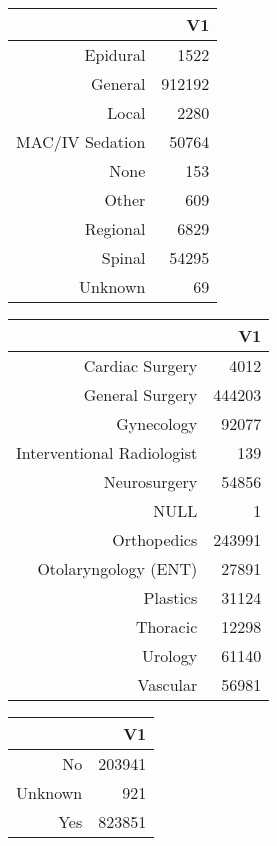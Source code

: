 \bigskip\bigskip
\centering
\begin{tabular}{rr}
  \hline
 & V1 \\ 
  \hline
Epidural & 1522 \\ 
  General & 912192 \\ 
  Local & 2280 \\ 
  MAC/IV Sedation & 50764 \\ 
  None & 153 \\ 
  Other & 609 \\ 
  Regional & 6829 \\ 
  Spinal & 54295 \\ 
  Unknown &  69 \\ 
   \hline
\end{tabular}

\bigskip\bigskip
\centering
\begin{tabular}{rr}
  \hline
 & V1 \\ 
  \hline
Cardiac Surgery & 4012 \\ 
  General Surgery & 444203 \\ 
  Gynecology & 92077 \\ 
  Interventional Radiologist & 139 \\ 
  Neurosurgery & 54856 \\ 
  NULL &   1 \\ 
  Orthopedics & 243991 \\ 
  Otolaryngology (ENT) & 27891 \\ 
  Plastics & 31124 \\ 
  Thoracic & 12298 \\ 
  Urology & 61140 \\ 
  Vascular & 56981 \\ 
   \hline
\end{tabular}

\bigskip\bigskip
\centering
\begin{tabular}{rr}
  \hline
 & V1 \\ 
  \hline
No & 203941 \\ 
  Unknown & 921 \\ 
  Yes & 823851 \\ 
   \hline
\end{tabular}

